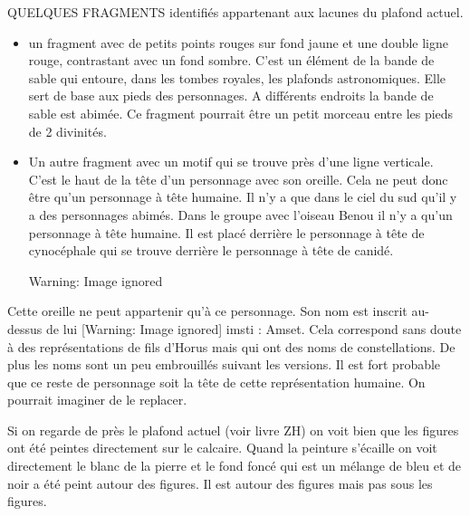 \documentclass{article}
\begin{document}
QUELQUES FRAGMENTS identifiés appartenant aux lacunes du plafond actuel.


\begin{itemize}
\item un fragment avec de petits points rouges sur fond jaune et une
double ligne rouge, contrastant avec un fond sombre. C’est un élément
de la bande de sable qui  entoure, dans les tombes royales, les
plafonds astronomiques. Elle sert de base aux pieds des personnages. A
différents endroits la bande de sable est abimée. Ce fragment pourrait
être un petit morceau entre les pieds de 2 divinités.
\end{itemize}
\begin{itemize}
\item Un autre fragment avec un motif qui se trouve près d’une ligne
verticale. C’est le haut de la tête d’un personnage avec son oreille.
Cela ne peut donc être qu’un personnage à tête humaine. Il n’y a que
dans le ciel du sud qu’il y a des personnages abimés.  Dans le groupe
avec l’oiseau Benou il n’y a qu’un personnage à tête humaine. Il est
placé derrière le personnage à tête de cynocéphale qui se trouve
derrière le personnage à tête de canidé. 
\end{itemize}
\begin{itemize}
\item   [Warning: Image ignored] %
 
\end{itemize}
Cette oreille ne peut appartenir qu’à ce personnage. Son nom est inscrit
au-dessus de lui    [Warning: Image ignored]
   imsti : Amset. Cela correspond sans doute à des représentations de
fils d’Horus mais qui ont des noms de constellations. De plus les noms
sont un peu embrouillés suivant les versions. Il est fort probable que
ce reste de personnage soit la tête de cette représentation humaine. On
pourrait imaginer de le replacer.

Si on regarde de près le plafond actuel (voir livre ZH) on voit bien que
les figures ont été peintes directement sur le calcaire. Quand la
peinture s’écaille on voit directement le blanc de la pierre et le fond
foncé qui est un mélange de bleu et de noir a été peint autour des
figures. Il est autour des figures mais pas sous les figures.
\end{document}
